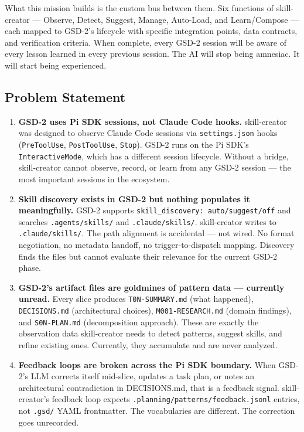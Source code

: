 \documentclass[11pt,letterpaper]{article}
\begin{document}
What this mission builds is the custom bus between them. Six functions of skill-creator --- Observe, Detect, Suggest, Manage, Auto-Load, and Learn/Compose --- each mapped to GSD-2's lifecycle with specific integration points, data contracts, and verification criteria. When complete, every GSD-2 session will be aware of every lesson learned in every previous session. The AI will stop being amnesiac. It will start being experienced.

\subsection{Problem Statement}

\begin{enumerate}
  \item \textbf{GSD-2 uses Pi SDK sessions, not Claude Code hooks.} skill-creator was designed to observe Claude Code sessions via \texttt{settings.json} hooks (\texttt{PreToolUse}, \texttt{PostToolUse}, \texttt{Stop}). GSD-2 runs on the Pi SDK's \texttt{InteractiveMode}, which has a different session lifecycle. Without a bridge, skill-creator cannot observe, record, or learn from any GSD-2 session --- the most important sessions in the ecosystem.

  \item \textbf{Skill discovery exists in GSD-2 but nothing populates it meaningfully.} GSD-2 supports \texttt{skill\_discovery: auto/suggest/off} and searches \texttt{.agents/skills/} and \texttt{.claude/skills/}. skill-creator writes to \texttt{.claude/skills/}. The path alignment is accidental --- not wired. No format negotiation, no metadata handoff, no trigger-to-dispatch mapping. Discovery finds the files but cannot evaluate their relevance for the current GSD-2 phase.

  \item \textbf{GSD-2's artifact files are goldmines of pattern data --- currently unread.} Every slice produces \texttt{T0N-SUMMARY.md} (what happened), \texttt{DECISIONS.md} (architectural choices), \texttt{M001-RESEARCH.md} (domain findings), and \texttt{S0N-PLAN.md} (decomposition approach). These are exactly the observation data skill-creator needs to detect patterns, suggest skills, and refine existing ones. Currently, they accumulate and are never analyzed.

  \item \textbf{Feedback loops are broken across the Pi SDK boundary.} When GSD-2's LLM corrects itself mid-slice, updates a task plan, or notes an architectural contradiction in DECISIONS.md, that is a feedback signal. skill-creator's feedback loop expects \texttt{.planning/patterns/feedback.jsonl} entries, not \texttt{.gsd/} YAML frontmatter. The vocabularies are different. The correction goes unrecorded.


\end{enumerate}
\end{document}
